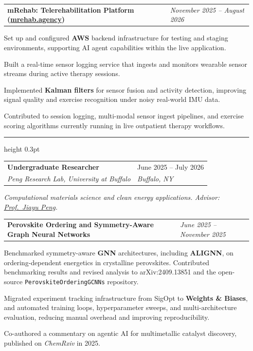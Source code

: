 \documentclass[11pt,a4paper]{article}
\makeatletter
\newcommand{\entrydivider}{%
  \vspace{4pt}%
  {\color{rulecolor}\hrule height 0.3pt}%
  \vspace{4pt}%
}
\newcommand{\roleentry}[4]{%
  \vspace{0.5em}%
  \begin{tabular*}{\textwidth}{@{\extracolsep{\fill}} ll}
    \textbf{#1} & #2 \\
    \textit{#3} & \textit{#4} \\
  \end{tabular*}%
  \vspace{0.15em}%
}
\newcommand{\subrole}[2]{%
  \vspace{0.45em}%
  \noindent\colorbox{subbg}{%
    \begin{minipage}{\dimexpr\textwidth-2\fboxsep}%
      \begin{tabular*}{\linewidth}{@{\extracolsep{\fill}} ll}
        \textbf{#1} & \textit{\small #2}%
      \end{tabular*}%
    \end{minipage}%
  }%
  \vspace{0.15em}%
}
\newcommand{\scopesentence}[1]{%
  \vspace{0.15em}%
  {\itshape #1}\par
  \vspace{0.1em}%
}
\makeatother
\begin{document}
\subrole{mRehab: Telerehabilitation Platform (\href{https://mrehab.agency/}{mrehab.agency})}{November 2025 -- August 2026}
\begin{cvlist}
  \item Set up and configured \textbf{AWS} backend infrastructure for testing and staging environments, supporting AI agent capabilities within the live application.
  \item Built a real-time sensor logging service that ingests and monitors wearable sensor streams during active therapy sessions.
  \item Implemented \textbf{Kalman filters} for sensor fusion and activity detection, improving signal quality and exercise recognition under noisy real-world IMU data.
  \item Contributed to session logging, multi-modal sensor ingest pipelines, and exercise scoring algorithms currently running in live outpatient therapy workflows.
\end{cvlist}

\entrydivider

\roleentry{Undergraduate Researcher}{June 2025 -- July 2026}{Peng Research Lab, University at Buffalo}{Buffalo, NY}
\scopesentence{Computational materials science and clean energy applications. Advisor: \href{https://ubwp.buffalo.edu/jiayu-peng-lab/}{Prof.\ Jiayu Peng}.}

\subrole{Perovskite Ordering and Symmetry-Aware Graph Neural Networks}{June 2025 -- November 2025}
\begin{cvlist}
  \item Benchmarked symmetry-aware \textbf{GNN} architectures, including \textbf{ALIGNN}, on ordering-dependent energetics in crystalline perovskites. Contributed benchmarking results and revised analysis to arXiv:2409.13851 and the open-source \texttt{PerovskiteOrderingGCNNs} repository.
  \item Migrated experiment tracking infrastructure from SigOpt to \textbf{Weights \& Biases}, and automated training loops, hyperparameter sweeps, and multi-architecture evaluation, reducing manual overhead and improving reproducibility.
  \item Co-authored a commentary on agentic AI for multimetallic catalyst discovery, published on \textit{ChemRxiv} in 2025.
\end{cvlist}
\end{document}
